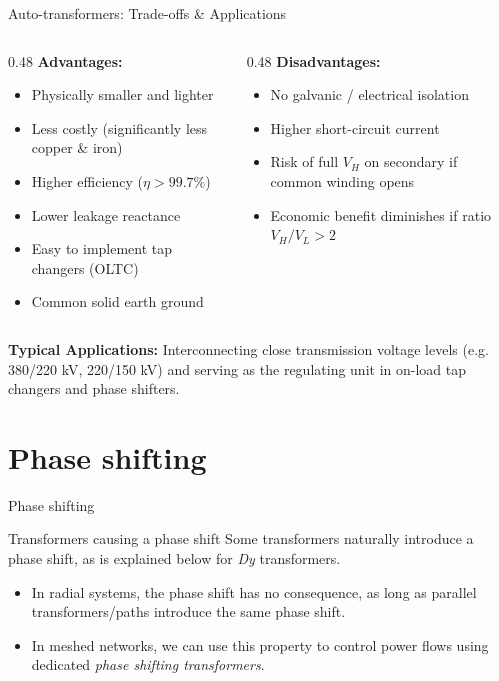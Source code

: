 \begin{frame}{Auto-transformers: Trade-offs \& Applications}
\begin{columns}[T]
    \begin{column}{0.48\textwidth}
        \textbf{Advantages:}
        \begin{itemize}
            \item Physically smaller and lighter
            \item Less costly (significantly less copper \& iron)
            \item Higher efficiency ($\eta > 99.7\%$)
            \item Lower leakage reactance
            \item Easy to implement tap changers (OLTC)
            \item Common solid earth ground
        \end{itemize}
    \end{column}
    \begin{column}{0.48\textwidth}
        \textbf{Disadvantages:}
        \begin{itemize}
            \item No galvanic / electrical isolation
            \item Higher short-circuit current
            \item Risk of full $V_H$ on secondary if common winding opens
            \item Economic benefit diminishes if ratio $V_H/V_L > 2$
        \end{itemize}
    \end{column}
\end{columns}

\vspace{0.25cm}
\footnotesize
\textbf{Typical Applications:} Interconnecting close transmission voltage levels (e.g. 380/220 kV, 220/150 kV) and serving as the regulating unit in on-load tap changers and phase shifters.
\end{frame}

\section{Phase shifting}

\begin{frame}{Phase shifting}

    \begin{block}{Transformers causing a phase shift}
        Some transformers naturally introduce a phase shift, as is explained below for \textit{Dy} transformers.
        \begin{itemize}
            \item In radial systems, the phase shift has no consequence, as long as parallel transformers/paths introduce the same phase shift.
            \item  In meshed networks, we can use this property to control power flows using dedicated \textit{phase shifting transformers}.
        \end{itemize}
    \end{block}
\end{frame}

